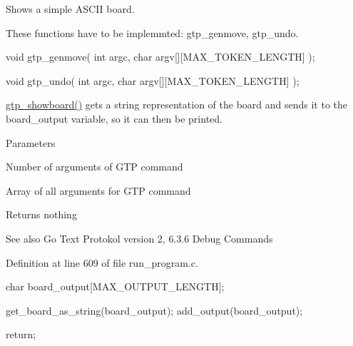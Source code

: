 Shows a simple ASCII board. 

\begin{Desc}
\item[\hyperlink{todo__todo000003}{Todo}]These functions have to be implemmted: gtp\_\-genmove, gtp\_\-undo.
\begin{DoxyItemize}
\item void gtp\_\-genmove( int argc, char argv\mbox{[}\mbox{]}\mbox{[}MAX\_\-TOKEN\_\-LENGTH\mbox{]} );
\item void gtp\_\-undo( int argc, char argv\mbox{[}\mbox{]}\mbox{[}MAX\_\-TOKEN\_\-LENGTH\mbox{]} ); 
\end{DoxyItemize}\end{Desc}


\hyperlink{group___g_t_p___debug___commands_ga7c297f28150386dc85b1de08e6f8d456}{gtp\_\-showboard()} gets a string representation of the board and sends it to the board\_\-output variable, so it can then be printed.


\begin{DoxyParams}{Parameters}
\item[\mbox{\tt[in]} {\em gtp\_\-argc}]Number of arguments of GTP command \item[\mbox{\tt[in]} {\em gtp\_\-argv}]Array of all arguments for GTP command \end{DoxyParams}
\begin{DoxyReturn}{Returns}
nothing 
\end{DoxyReturn}
\begin{DoxySeeAlso}{See also}
Go Text Protokol version 2, 6.3.6 Debug Commands 
\end{DoxySeeAlso}


Definition at line 609 of file run\_\-program.c.




\begin{DoxyCode}
{
    char board_output[MAX_OUTPUT_LENGTH];

    get_board_as_string(board_output);
    add_output(board_output);

    return;
}
\end{DoxyCode}


